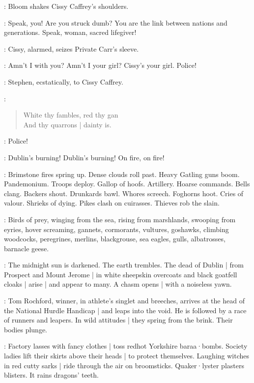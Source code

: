 :
Bloom shakes Cissy Caffrey's shoulders.

\Bloom:
Speak,
you!
Are you struck dumb?
You are the link between nations and generations.
Speak,
woman,
sacred lifegiver!

:
Cissy,
alarmed,
seizes Private Carr's sleeve.

\Cissy:
Amn't I with you?
Amn't I your girl?
Cissy's your girl.
Police!

:
Stephen,
ecstatically,
to Cissy Caffrey.

\Stephen:
\begin{verse}
    White thy fambles,
        red thy gan\\
    And thy quarrons |
        dainty is.
\end{verse}

\Voices:
Police!

\DistantVoices:
Dublin's burning!
Dublin's burning!
%
On fire,
on fire!

:
Brimstone fires spring up.
Dense clouds roll past.
Heavy Gatling guns boom.
Pandemonium.
Troops deploy.
Gallop of hoofs.
Artillery.
Hoarse commands.
Bells clang.
Backers shout.
Drunkards bawl.
Whores screech.
Foghorns hoot.
Cries of valour.
Shrieks of dying.
Pikes clash on cuirasses.
Thieves rob the slain.

:
Birds of prey,
winging from the sea,
rising from marshlands,
swooping from eyries,
hover screaming,
gannets,
cormorants,
vultures,
goshawks,
climbing woodcocks,
peregrines,
merlins,
blackgrouse,
sea eagles,
gulls,
albatrosses,
barnacle geese.

:
The midnight sun is darkened.
The earth trembles.
%
The dead of Dublin |
from Prospect and Mount Jerome |
in white sheepskin overcoats and black goatfell cloaks |
arise |
and appear to many.
A chasm opens |
with a noiseless yawn.

:
Tom Rochford,
winner,
in athlete's singlet and breeches,
arrives at the head of the National Hurdle Handicap |
and leaps into the void.
He is followed by a race of runners and leapers.
In wild attitudes |
they spring from the brink.
Their bodies plunge.

:
Factory lasses with fancy clothes |
toss redhot Yorkshire baraa·bombs.
Society ladies lift their skirts above their heads |
to protect themselves.
Laughing witches in red cutty sarks |
ride through the air on broomsticks.
Quaker·lyster plasters blisters.
%
It rains dragons' teeth.

